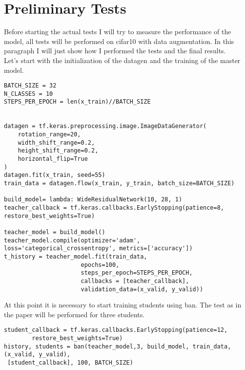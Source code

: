\section{Preliminary Tests}
Before starting the actual tests I will try to measure the performance of the model, all tests will be performed on cifar10 with data augmentation. In this paragraph I will just show how I performed the tests and the final results.\\
Let's start with the initialization of the datagen and the training of the master model.\\

\lstset{language=Python}
\lstset{frame=lines}
\lstset{basicstyle=\footnotesize}
\begin{lstlisting}
BATCH_SIZE = 32
N_CLASSES = 10
STEPS_PER_EPOCH = len(x_train)//BATCH_SIZE


datagen = tf.keras.preprocessing.image.ImageDataGenerator(
    rotation_range=20,
    width_shift_range=0.2,
    height_shift_range=0.2,
    horizontal_flip=True
)
datagen.fit(x_train, seed=55)
train_data = datagen.flow(x_train, y_train, batch_size=BATCH_SIZE)

build_model= lambda: WideResidualNetwork(10, 28, 1)
teacher_callback = tf.keras.callbacks.EarlyStopping(patience=8, restore_best_weights=True)

teacher_model = build_model()
teacher_model.compile(optimizer='adam', loss='categorical_crossentropy', metrics=['accuracy'])
t_history = teacher_model.fit(train_data,             
                      epochs=100,
                      steps_per_epoch=STEPS_PER_EPOCH,
                      callbacks = [teacher_callback],
                      validation_data=(x_valid, y_valid))
\end{lstlisting}
At this point it is necessary to start training students using ban. The test as in the paper will be performed for three students.\\

\lstset{language=Python}
\lstset{frame=lines}
\lstset{basicstyle=\footnotesize}
\begin{lstlisting}
student_callback = tf.keras.callbacks.EarlyStopping(patience=12,   
		restore_best_weights=True)
history, students = ban(teacher_model,3, build_model, train_data, (x_valid, y_valid),
 [student_callback], 100, BATCH_SIZE)
\end{lstlisting}

